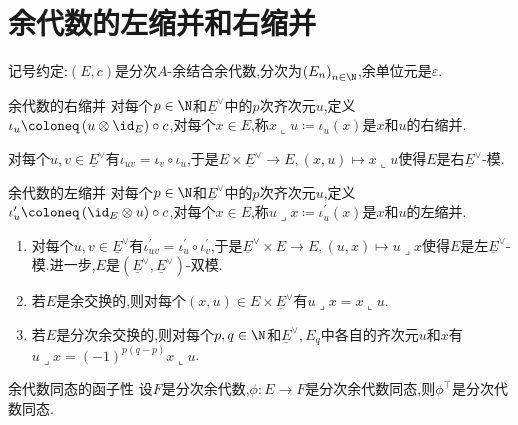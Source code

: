 \section{余代数的左缩并和右缩并}

记号约定:$\left(E,c\right)$是分次$A$-余结合余代数,分次为$\left(E_{n}\right)_{n\in\N}$,余单位元是$\varepsilon$.

\begin{definition}{余代数的右缩并}{}
	对每个$p\in\N$和$\underline{E}^{\vee}$中的$p$次齐次元$u$,定义$\iota_{u}\coloneq\left(u\otimes\id_{E}\right)\circ c$,对每个$x\in E$,称$x\llcorner u\coloneq\iota_{u}\left(x\right)$是$x$和$u$的右缩并.
\end{definition}

\begin{remark}{}{}
	对每个$u,v\in\underline{E}^{\vee}$有$\iota_{uv}=\iota_{v}\circ\iota_{u}$,于是$E\times\underline{E}^{\vee}\to E,\left(x,u\right)\mapsto x\llcorner u$使得$E$是右$\underline{E}^{\vee}$-模.
\end{remark}

\begin{definition}{余代数的左缩并}{}
	对每个$p\in\N$和$\underline{E}^{\vee}$中的$p$次齐次元$u$,定义$\iota_{u}^{\prime}\coloneq\left(\id_{E}\otimes u\right)\circ c$,对每个$x\in E$,称$u\lrcorner x\coloneq\iota_{u}^{\prime}\left(x\right)$是$x$和$u$的左缩并.
\end{definition}

\begin{remark}{}{}
	\begin{enumerate}
		\item 对每个$u,v\in\underline{E}^{\vee}$有$\iota_{uv}^{\prime}=\iota_{u}^{\prime}\circ\iota_{v}^{\prime}$,于是$\underline{E}^{\vee}\times E\to E,\left(u,x\right)\mapsto u\lrcorner x$使得$E$是左$\underline{E}^{\vee}$-模.进一步,$E$是$\left(\underline{E}^{\vee},\underline{E}^{\vee}\right)$-双模.
		\item 若$E$是余交换的,则对每个$\left(x,u\right)\in E\times\underline{E}^{\vee}$有$u\lrcorner x=x\llcorner u$.
		\item 若$E$是分次余交换的,则对每个$p,q\in\N$和$\underline{E}^{\vee},E_{q}$中各自的齐次元$u$和$x$有$u\lrcorner x=\left(-1\right)^{p\left(q-p\right)}x\llcorner u$.
	\end{enumerate}
\end{remark}

\begin{proposition}{余代数同态的函子性}{}
	设$F$是分次余代数,$\phi:E\to F$是分次余代数同态,则$\phi^{\top}$是分次代数同态.
\end{proposition}

